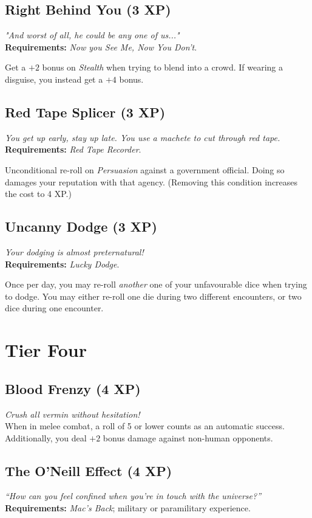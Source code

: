 \subsection*{Right Behind You (3 XP)}
\textit{"And worst of all, he could be any one of us..."}\\
\textbf{Requirements:} \textit{Now you See Me, Now You Don't}.

Get a $+2$ bonus on \textit{Stealth} when trying to blend into a crowd.
If wearing a disguise, you instead get a $+4$ bonus.

\subsection*{Red Tape Splicer (3 XP)}
\textit{You get up early, stay up late. You use a machete to cut through red tape.}\\
\textbf{Requirements:} \textit{Red Tape Recorder}.

Unconditional re-roll on \textit{Persuasion} against a government official.
Doing so damages your reputation with that agency.
(Removing this condition increases the cost to 4 XP.)

\subsection*{Uncanny Dodge (3 XP)}
\textit{Your dodging is almost preternatural!}\\
\textbf{Requirements:} \textit{Lucky Dodge}.

Once per day, you may re-roll \textit{another} one of your unfavourable dice when trying to dodge.
You may either re-roll one die during two different encounters, or two dice during one encounter.

\section{Tier Four}

\subsection*{Blood Frenzy (4 XP)}
\textit{Crush all vermin without hesitation!}\\
When in melee combat, a roll of 5 or lower counts as an automatic success.
Additionally, you deal $+2$ bonus damage against non-human opponents.

\subsection*{The O'Neill Effect (4 XP)}
\textit{``How can you feel confined when you're in touch with the universe?''}\\
\textbf{Requirements:} \textit{Mac's Back}; military or paramilitary experience. 

